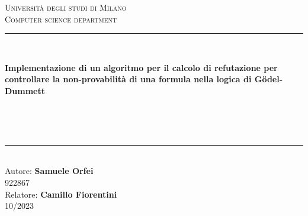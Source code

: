 \documentclass[\main/tesi.tex]{subfiles}
\begin{document}
\pagestyle{empty}
\begin{titlepage}
    \begin{center}
        \vfill
        {\large \scshape Università degli studi di Milano}\\[0.1cm]
        {\large \scshape Computer science department}\\[0.5cm]
        \rule{\textwidth}{1.5pt}\\[0cm]
        {\huge \bfseries  Implementazione di un algoritmo per il calcolo di refutazione per controllare la non-provabilità di una formula nella logica di G\"odel-Dummett \par \ }\\[-0.5cm]
        \rule{\textwidth}{1.5pt}\\[2.5cm]
        {\hfill \large Autore: \textbf{Samuele Orfei}} \\
        \vspace{0.1cm}
        {\hfill \large 922867} \\
        \vspace{0.5cm}
        {\hfill \large Relatore: \textbf{Camillo Fiorentini}} \\
        \vspace{1cm}
        \hfill  10/2023
    \end{center}
\end{titlepage}
\end{document}
